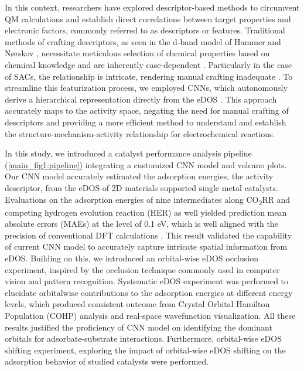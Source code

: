     In this context, researchers have explored descriptor-based methods to circumvent QM calculations and establish direct correlations between target properties and electronic factors, commonly referred to as descriptors or features.
    Traditional methods of crafting descriptors, as seen in the d-band model of Hammer and Nørskov \cite{hammer1995electronic}, necessitate meticulous selection of chemical properties based on chemical knowledge and are inherently case-dependent \cite{kajita2017universal}.
    Particularly in the case of SACs, the relationship is intricate, rendering manual crafting inadequate \cite{han2021single, thirumalai2018investigating}.
    To streamline this featurization process, we employed CNNs, which autonomously derive a hierarchical representation directly from the eDOS \cite{tran2015learning, socher2012convolutional, NIPS2012_c399862d}.
    This approach accurately maps to the activity space, negating the need for manual crafting of descriptors and providing a more efficient method to understand and establish the structure-mechanism-activity relationship for electrochemical reactions.

    In this study, we introduced a catalyst performance analysis pipeline (\cref{main_fig1:pipeline}) integrating a customized CNN model and volcano plots.
    Our CNN model accurately estimated the adsorption energies, the activity descriptor, from the eDOS of 2D materials supported single metal catalysts.
    Evaluations on the adsorption energies of nine intermediates along CO\textsubscript{2}RR and competing hydrogen evolution reaction (HER) as well yielded prediction mean absolute errors (MAEs) at the level of 0.1 eV, which is well aligned with the precision of conventional DFT calculations \cite{kirklin2015open, lejaeghere2016reproducibility, wellendorff2015benchmark}.
    This result validated the capability of current CNN model to accurately capture intricate spatial information from eDOS.
    Building on this, we introduced an orbital-wise eDOS occlusion experiment, inspired by the occlusion technique commonly used in computer vision and pattern recognition.
    Systematic eDOS experiment was performed to elucidate orbitalwise contributions to the adsorption energies at different energy levels, which produced consistent outcome from Crystal Orbital Hamilton Population (COHP) analysis and real-space wavefunction visualization.
    All these results justified the proficiency of CNN model on identifying the dominant orbitals for adsorbate-substrate interactions.
    Furthermore, orbital-wise eDOS shifting experiment, exploring the impact of orbital-wise eDOS shifting on the adsorption behavior of studied catalysts were performed.

